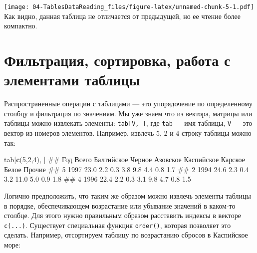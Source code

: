 \documentclass[]{book}
\newenvironment{Shaded}{\begin{snugshade}}{\end{snugshade}}
\newcommand{\KeywordTok}[1]{\textcolor[rgb]{0.13,0.29,0.53}{\textbf{#1}}}
\newcommand{\DecValTok}[1]{\textcolor[rgb]{0.00,0.00,0.81}{#1}}
\newcommand{\OperatorTok}[1]{\textcolor[rgb]{0.81,0.36,0.00}{\textbf{#1}}}
\newcommand{\NormalTok}[1]{#1}
\begin{document}
\texttt{[image: 04-TablesDataReading\_files/figure-latex/unnamed-chunk-5-1.pdf]}
Как видно, данная таблица не отличается от предыдущей, но ее чтение
более компактно.

\section{Фильтрация, сортировка, работа с элементами
таблицы}\label{filtering_sorting}

Распространенные операции с таблицами --- это упорядочение по
определенному столбцу и фильтрация по значениям. Мы уже знаем что из
вектора, матрицы или таблицы можно извлекать элементы:
\texttt{tab{[}V,\ {]}}, где \texttt{tab} --- имя таблицы, \texttt{V} ---
это вектор из номеров элементов. Например, извлечь 5, 2 и 4 строку
таблицы можно так:

\begin{Shaded}
\begin{Highlighting}[]
\NormalTok{tab[}\KeywordTok{c}\NormalTok{(}\DecValTok{5}\NormalTok{,}\DecValTok{2}\NormalTok{,}\DecValTok{4}\NormalTok{), ]}
\NormalTok{##    Год Всего Балтийское Черное Азовское Каспийское Карское Белое Прочие}
\NormalTok{## 5 1997  23.0        2.2    0.3      3.8        9.8     4.4   0.8    1.7}
\NormalTok{## 2 1994  24.6        2.3    0.4      3.2       11.0     5.0   0.9    1.8}
\NormalTok{## 4 1996  22.4        2.2    0.3      3.1        9.8     4.7   0.8    1.5}
\end{Highlighting}
\end{Shaded}

Логично предположить, что таким же образом можно извлечь элементы
таблицы в порядке, обеспечивающем возрастание или убывание значений в
каком-то столбце. Для этого нужно правильным образом расставить индексы
в векторе \texttt{c(...)}. Существует специальная функция
\texttt{order()}, которая позволяет это сделать. Например, отсортируем
таблицу по возрастанию сбросов в Каспийское море:

\begin{Shaded}
\end{Shaded}
\end{document}
